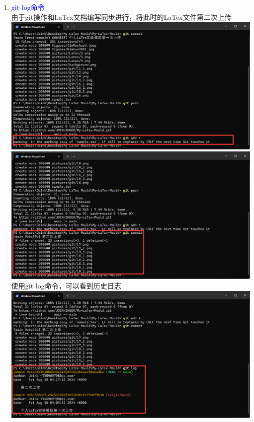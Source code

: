\documentclass[12pt,a4paper,UTF8]{article}
\begin{document}
\begin{enumerate}
        \item \textcolor{blue}{git log命令}\\
        由于git操作和LaTex文档编写同步进行，将此时的LaTex文件第二次上传\\[6pt]
        \includegraphics[scale=0.25]{pictures/git/20_1.png}\\
        \includegraphics[scale=0.25]{pictures/git/20_2.png}\\
        使用git log命令，可以看到历史日志\\[6pt]
        \includegraphics[scale=0.25]{pictures/git/20_3.png}
        
    \end{enumerate}
\end{document}
